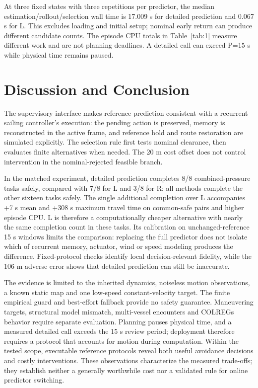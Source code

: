 \documentclass[conference]{IEEEtran}
\begin{document}
At three fixed states with three repetitions per predictor, the median estimation/rollout/selection wall time is 17.009 s for detailed prediction and 0.067 s for L. This excludes loading and initial setup; nominal early return can produce different candidate counts. The episode CPU totals in Table~\ref{tab:1} measure different work and are not planning deadlines. A detailed call can exceed P=15 s while physical time remains paused.

\section{Discussion and Conclusion}

The supervisory interface makes reference prediction consistent with a recurrent sailing controller's execution: the pending action is preserved, memory is reconstructed in the active frame, and reference hold and route restoration are simulated explicitly. The selection rule first tests nominal clearance, then evaluates finite alternatives when needed. The 20 m cost offset does not control intervention in the nominal-rejected feasible branch.

In the matched experiment, detailed prediction completes 8/8 combined-pressure tasks safely, compared with 7/8 for L and 3/8 for R; all methods complete the other sixteen tasks safely. The single additional completion over L accompanies +7 s mean and +308 s maximum travel time on common-safe pairs and higher episode CPU. L is therefore a computationally cheaper alternative with nearly the same completion count in these tasks. Its calibration on unchanged-reference 15 s windows limits the comparison: replacing the full predictor does not isolate which of recurrent memory, actuator, wind or speed modeling produces the difference. Fixed-protocol checks identify local decision-relevant fidelity, while the 106 m adverse error shows that detailed prediction can still be inaccurate.

The evidence is limited to the inherited dynamics, noiseless motion observations, a known static map and one low-speed constant-velocity target. The finite empirical guard and best-effort fallback provide no safety guarantee. Maneuvering targets, structural model mismatch, multi-vessel encounters and COLREGs behavior require separate evaluation. Planning pauses physical time, and a measured detailed call exceeds the 15 s review period; deployment therefore requires a protocol that accounts for motion during computation. Within the tested scope, executable reference protocols reveal both useful avoidance decisions and costly interventions. These observations characterize the measured trade-offs; they establish neither a generally worthwhile cost nor a validated rule for online predictor switching.
\end{document}
